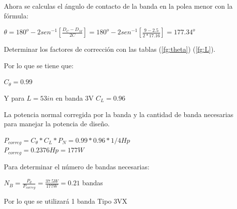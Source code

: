 Ahora se calculas el ángulo de contacto de la banda en la polea menor con la fórmula:

\begin{center}
	$\theta = 180^o - 2sen^{-1}[\frac{D_C - D_M}{2C}] = 180^o - 2sen^{-1}[\frac{9 - 2.5}{2*17.16}]= 177.34^o$
\end{center}

Determinar los factores de corrección con las tablas (\ref{fg:theta}) (\ref{fg:L}).

Por lo que se tiene que:

$C_\theta = 0.99$

Y para $L = 53 in$ en banda 3V $C_L = 0.96$  

La potencia normal corregida por la banda y la cantidad de banda necesarias para manejar la potencia de diseño.

\begin{center}
	$P_{correg} =C_\theta * C_L * P_N = 0.99 * 0.96 * 1/4 Hp$ \\
	$P_{correg} = 0.2376 Hp = 177 W$
\end{center}

Para determinar el número de bandas necesarias:

\begin{center}
	$N_B = \frac{P_d}{P_{correg}} = \frac{37.5 W}{177 W} = 0.21$ bandas 
\end{center}

Por lo que se utilizará 1 banda Tipo 3VX
